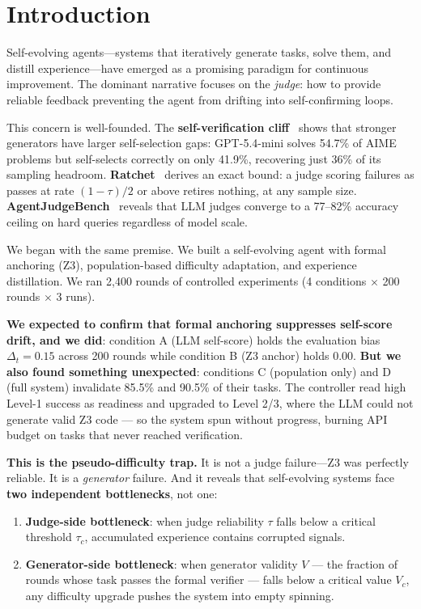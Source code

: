 \documentclass{article}
\begin{document}
\section{Introduction}

Self-evolving agents---systems that iteratively generate tasks, solve them, and distill
experience---have emerged as a promising paradigm for continuous improvement. The dominant
narrative focuses on the \textit{judge}: how to provide reliable feedback preventing the agent from
drifting into self-confirming loops.

This concern is well-founded. The \textbf{self-verification cliff}~\cite{self_verification_cliff}
shows that stronger generators have larger self-selection gaps: GPT-5.4-mini solves 54.7\% of AIME
problems but self-selects correctly on only 41.9\%, recovering just 36\% of its sampling headroom.
\textbf{Ratchet}~\cite{ratchet} derives an exact bound: a judge scoring failures as passes at rate
$(1-\tau)/2$ or above retires nothing, at any sample size. \textbf{AgentJudgeBench}~\cite{agentjudgebench}
reveals that LLM judges converge to a 77--82\% accuracy ceiling on hard queries regardless of model
scale.

We began with the same premise. We built a self-evolving agent with formal anchoring (Z3),
population-based difficulty adaptation, and experience distillation. We ran 2,400 rounds of
controlled experiments (4 conditions $\times$ 200 rounds $\times$ 3 runs).

\textbf{We expected to confirm that formal anchoring suppresses self-score drift, and we did}:
condition A (LLM self-score) holds the evaluation bias $\Delta_t = 0.15$ across 200 rounds while
condition B (Z3 anchor) holds $0.00$. \textbf{But we also found something unexpected}: conditions C (population only) and D
(full system) invalidate 85.5\% and 90.5\% of their tasks. The controller read high Level-1 success as
readiness and upgraded to Level 2/3, where the LLM could not generate valid Z3 code --- so the system
spun without progress, burning API budget on tasks that never reached verification.

\textbf{This is the pseudo-difficulty trap.}  It is not a judge failure---Z3 was perfectly reliable.
It is a \textit{generator} failure. And it reveals that self-evolving systems face \textbf{two
independent bottlenecks}, not one:

\begin{enumerate}
  \item \textbf{Judge-side bottleneck}: when judge reliability $\tau$ falls below a critical
        threshold $\tau_c$, accumulated experience contains corrupted signals.
  \item \textbf{Generator-side bottleneck}: when generator validity $V$ --- the fraction of rounds
        whose task passes the formal verifier --- falls below a critical value $V_c$, any difficulty
        upgrade pushes the system into empty spinning.
\end{enumerate}
\end{document}
